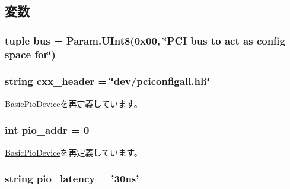 \subsection{変数}
\hypertarget{classPci_1_1PciConfigAll_aef53eac6bf8304a31e35b7307a2c3fe2}{
\subsubsection[{bus}]{\setlength{\rightskip}{0pt plus 5cm}tuple {\bf bus} = Param.UInt8(0x00, \char`\"{}PCI bus to act as config space for\char`\"{})}}
\label{classPci_1_1PciConfigAll_aef53eac6bf8304a31e35b7307a2c3fe2}
\hypertarget{classPci_1_1PciConfigAll_a17da7064bc5c518791f0c891eff05fda}{
\subsubsection[{cxx\_\-header}]{\setlength{\rightskip}{0pt plus 5cm}string {\bf cxx\_\-header} = \char`\"{}dev/pciconfigall.hh\char`\"{}}}
\label{classPci_1_1PciConfigAll_a17da7064bc5c518791f0c891eff05fda}


\hyperlink{classDevice_1_1BasicPioDevice_a17da7064bc5c518791f0c891eff05fda}{BasicPioDevice}を再定義しています。\hypertarget{classPci_1_1PciConfigAll_a659450bdbf05cdba8edf24c47df67671}{
\subsubsection[{pio\_\-addr}]{\setlength{\rightskip}{0pt plus 5cm}int {\bf pio\_\-addr} = 0}}
\label{classPci_1_1PciConfigAll_a659450bdbf05cdba8edf24c47df67671}


\hyperlink{classDevice_1_1BasicPioDevice_aac8239d62c5a04a05fcc71d4ac63fdb4}{BasicPioDevice}を再定義しています。\hypertarget{classPci_1_1PciConfigAll_aa933b0c4a9c52039f5a3f5a97a97fc9f}{
\subsubsection[{pio\_\-latency}]{\setlength{\rightskip}{0pt plus 5cm}string {\bf pio\_\-latency} = '30ns'}}
\label{classPci_1_1PciConfigAll_aa933b0c4a9c52039f5a3f5a97a97fc9f}


